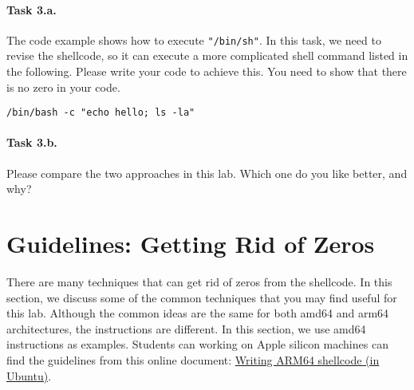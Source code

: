 \paragraph{Task 3.a.}
The code example shows how to execute \texttt{"/bin/sh"}.
In this task, we need to revise the shellcode, so it can 
execute a more complicated shell command listed in the 
following. 
Please write your code to achieve this. 
You need to show that there is no zero in your code. 

\begin{lstlisting}
/bin/bash -c "echo hello; ls -la"
\end{lstlisting}


\paragraph{Task 3.b.}
Please compare the two approaches in this lab. Which
one do you like better, and why? 


\section{Guidelines: Getting Rid of Zeros}
\label{sec:zero}

There are many techniques that can get rid of zeros
from the shellcode. In this section, we discuss some of the 
common techniques that you may find useful for this lab. 
Although the common ideas are the same for both amd64 and arm64
architectures, the instructions are different. 
In this section, we use amd64 instructions as examples. 
Students can working on Apple silicon machines can 
find the guidelines from this online 
document:
\href{https://github.com/seed-labs/seed-labs/blob/master/category-software/Shellcode/arm/shellcode_arm64.md}{Writing ARM64 shellcode (in Ubuntu)}. 


